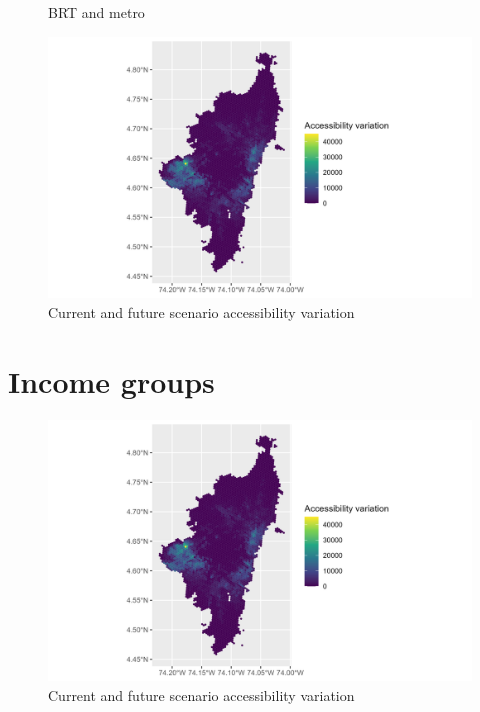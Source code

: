 \documentclass[12pt, a4paper]{report}
\begin{document}
\begin{figure}[H]
\begin{minipage}{0.45\textwidth}
         \caption{BRT and metro}
        \label{fig:Results_Opportunities}
    \end{minipage}    
\end{figure}


\begin{figure}[H]
    \centering
    \includegraphics[width=14cm]{Data/Results/Images/Access_diff_BRT_Metro_base.png}
    \caption{Current and future scenario accessibility variation}
    \label{fig:Access_Variation}
\end{figure}


\section{Income groups}

\begin{figure}[H]
    \centering
    \includegraphics[width=14cm]{Data/Results/Images/Access_diff_BRT_Metro_base.png}
    \caption{Current and future scenario accessibility variation}
    \label{fig:Access_Variation}
\end{figure}
\end{document}
